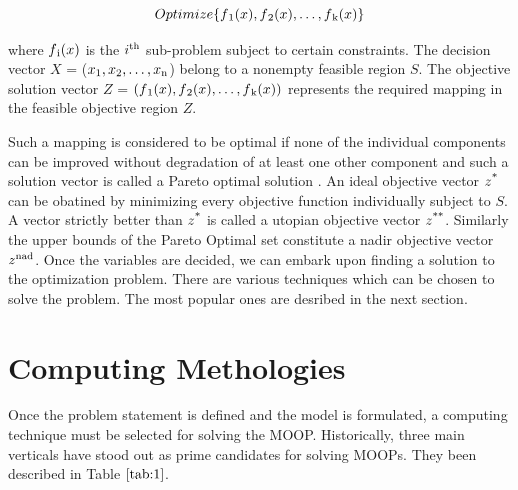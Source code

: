 \documentclass[conference]{IEEEtran}
\begin{document}
{\scriptsize
\begin{equation}
Optimize \{f\textsubscript{1}(x), f\textsubscript{2}(x), \dots, f\textsubscript{k}(x)\}
\end{equation}
}

where $f\textsubscript{i}(x)$ is the $i\textsuperscript{th}$ sub-problem subject to certain constraints. The decision vector $X$ = ($x\textsubscript{1}, x\textsubscript{2}, \dots, x\textsubscript{n}$) belong to a nonempty feasible region $S$. The objective solution vector $Z$ =  $(f\textsubscript{1}(x), f\textsubscript{2}(x), \dots, f\textsubscript{k}(x))$ represents the required mapping in the feasible objective region $Z$. 

Such a mapping is considered to be optimal if none of the individual components can be improved without degradation of at least one other component and such a solution vector is called a Pareto optimal solution \cite{pare}. An ideal objective vector $z\textsuperscript{*}$ can be obatined by minimizing every objective function individually subject to $S$. A vector strictly better than $z\textsuperscript{*}$ is called a utopian objective vector $z\textsuperscript{**}$. Similarly the upper bounds of the Pareto Optimal set constitute a nadir objective vector $z\textsuperscript{nad}$. Once the variables are decided, we can embark upon finding a solution to the optimization problem. There are various techniques which can be chosen to solve the problem. The most popular ones are desribed in the next section. 

\section{Computing Methologies}

Once the problem statement is defined and the model is formulated, a computing technique must be selected for solving the MOOP. Historically, three main verticals have stood out as prime candidates for solving MOOPs. They been described in Table $\ref{tab:1}$. 
\end{document}
